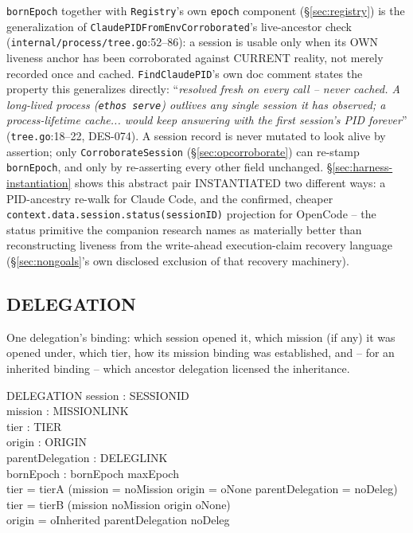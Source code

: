 \documentclass[a4paper,10pt,fleqn]{article}
\newcommand{\fpath}[1]{\texttt{#1}}
\newcommand{\field}[1]{\texttt{#1}}
\begin{document}
\field{bornEpoch} together with \field{Registry}'s own \field{epoch}
component (\S\ref{sec:registry}) is the generalization of
\field{ClaudePIDFromEnvCorroborated}'s live-ancestor check
(\fpath{internal/process/tree.go}:52--86): a session is usable only
when its OWN liveness anchor has been corroborated against CURRENT
reality, not merely recorded once and cached. \field{FindClaudePID}'s
own doc comment states the property this generalizes directly:
``\emph{resolved fresh on every call -- never cached. A long-lived
process (\field{ethos serve}) outlives any single session it has
observed; a process-lifetime cache... would keep answering with the
first session's PID forever}'' (\fpath{tree.go}:18--22, DES-074). A
session record is never mutated to look alive by assertion; only
\field{CorroborateSession} (\S\ref{sec:opcorroborate}) can re-stamp
\field{bornEpoch}, and only by re-asserting every other field unchanged.
\S\ref{sec:harness-instantiation} shows this abstract pair
INSTANTIATED two different ways: a PID-ancestry re-walk for Claude
Code, and the confirmed, cheaper
\field{context.data.session.status(sessionID)} projection for
OpenCode -- the status primitive the companion research names as
materially better than reconstructing liveness from the write-ahead
execution-claim recovery language (\S\ref{sec:nongoals}'s own
disclosed exclusion of that recovery machinery).

\subsection{DELEGATION}
\label{sec:delegation-schema}

One delegation's binding: which session opened it, which mission (if
any) it was opened under, which tier, how its mission binding was
established, and -- for an inherited binding -- which ancestor
delegation licensed the inheritance.

\begin{schema}{DELEGATION}
session : SESSIONID \\
mission : MISSIONLINK \\
tier : TIER \\
origin : ORIGIN \\
parentDelegation : DELEGLINK \\
bornEpoch : \nat
\where
bornEpoch \leq maxEpoch \\
tier = tierA \implies
  (mission = noMission \land origin = oNone \land parentDelegation = noDeleg) \\
tier = tierB \implies (mission \neq noMission \land origin \neq oNone) \\
origin = oInherited \iff parentDelegation \neq noDeleg
\end{schema}
\end{document}
